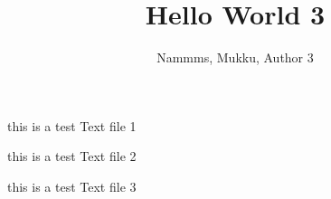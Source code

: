 \documentclass{article}
\title{Hello World 3}
\author{Nammms, Mukku, Author 3}
\begin{document}
\maketitle

this is a test Text file 1

this is a test Text file 2

this is a test Text file 3
\end{document}
